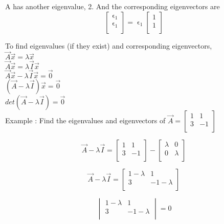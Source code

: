 \documentclass[12pt, letterpaper, twoside]{article}
\begin{document}
		A has another eigenvalue, 2. And the corresponding eigenvectors are 
		\[
		\begin{bmatrix}
		  \upvarepsilon_1\\
		  \upvarepsilon_1\\
		\end{bmatrix}
		= \upvarepsilon_1
		\begin{bmatrix}
		  1\\
		  1\\
		\end{bmatrix}
		\]
		
		To find eigenvalues (if they exist) and corresponding eigenvectors,\\
		$\vec{A} \vec{x} = \lambda \vec{x}$\\
		$\vec{A} \vec{x} = \lambda \vec{I} \vec{x}$\\
		$\vec{A} \vec{x} - \lambda \vec{I} \vec{x} = \vec{0}$\\
		$(\vec{A} - \lambda \vec{I})\vec{x} = \vec{0}$\\
		$det(\vec{A} - \lambda \vec{I}) = \vec{0}$\\
		Example : Find the eigenvalues and eigenvectors of 
		$\vec{A} = \begin{bmatrix}
		  1 & 1\\
		  3 & -1\\
		\end{bmatrix}$
		
		$$\vec{A} - \lambda \vec{I} = 
		\begin{bmatrix}
		  1 & 1\\
		  3 & -1\\
		\end{bmatrix}
		-
		\begin{bmatrix}
		  \lambda & 0\\
		  0 & \lambda\\
		\end{bmatrix}$$
		
		$$\vec{A} - \lambda \vec{I} = 
		\begin{bmatrix}
		  1 - \lambda & 1\\
		  3 & -1 - \lambda\\
		\end{bmatrix}$$
		
		$$\begin{vmatrix}
		  1 - \lambda & 1\\
		  3 & -1 - \lambda\\
		\end{vmatrix} = 0$$
		
\end{document}

